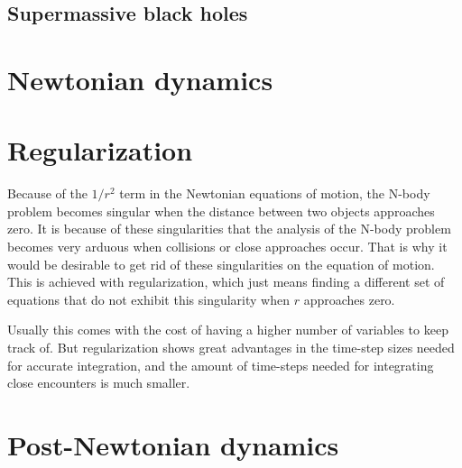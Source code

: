 \documentclass[english, oneside]{HYgradu}
\begin{document}

\subsection{Supermassive black holes}



\section{Newtonian dynamics}


\section{Regularization}

Because of the $1/r^2$ term in the Newtonian equations of motion, the N-body problem becomes singular when the distance between two objects approaches zero. It is because of these singularities that the analysis of the N-body problem becomes very arduous when collisions or close approaches occur. That is why it would be desirable to get rid of these singularities on the equation of motion. This is achieved with regularization, which just means finding a different set of equations that do not exhibit this singularity when $r$ approaches zero.

Usually this comes with the cost of having a higher number of variables to keep track of. But regularization shows great advantages in the time-step sizes needed for accurate integration, and the amount of time-steps needed for integrating close encounters is much smaller. 

\section{Post-Newtonian dynamics}
\end{document}
